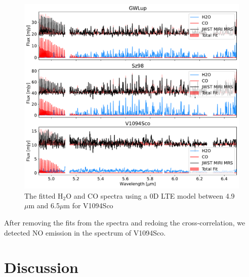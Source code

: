 \documentclass[twoside, single, authoryear, semicolon]{lion-msc}
\newcommand{\4}{$_4$}
\newcommand{\3}{$_3$}
\newcommand{\2}{$_2$}
\begin{document}
\begin{figure}[!ht]
    \centering
    \includegraphics[width=\linewidth]{Figures/Fits.pdf}
    \caption{The fitted H\2O and CO spectra using a 0D LTE model between 4.9 $\mu$m and 6.5$\mu$m for V1094Sco}
    \label{fig: v1094sco}
\end{figure}

After removing the fits from the spectra and redoing the cross-correlation, we detected NO emission in the spectrum of V1094Sco.



\chapter{Discussion}\label{Ch: Discussion}
\end{document}
